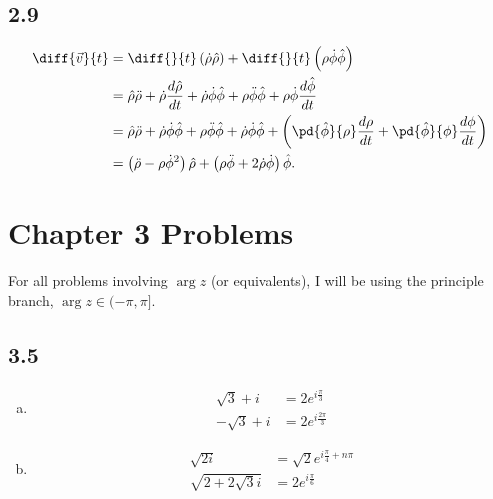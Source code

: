 \documentclass[10pt]{mypackage}
\begin{document}
\subsection{2.9}%
\begin{align*}
  \diff{\vec{v}}{t} &= \diff{}{t}\left(\dot{\rho}\hat\rho\right) + \diff{}{t}\left(\rho\dot\phi\hat\phi\right)\\
                    &= \hat{\rho}\ddot{\rho} + \dot\rho\frac{d\hat\rho}{dt} + \dot\rho\dot\phi\hat{\phi} + \rho\ddot\phi\hat\phi + \rho\dot\phi\frac{d\hat{\phi}}{dt}\\
                    &= \hat\rho\ddot\rho + \dot\rho\dot{\phi}\hat\phi + \rho\ddot\phi\hat\phi + \dot\rho\dot\phi\hat\phi + \left(\pd{\hat\phi}{\rho}\frac{d\rho}{dt} + \pd{\hat\phi}{\phi}\frac{d\phi}{dt}\right)\\
                    &= \left(\ddot\rho - \rho\dot\phi^2\right) \hat{\rho} + \left(\rho\ddot\phi + 2\dot\rho\dot\phi\right)\hat{\phi}.
\end{align*}
\section{Chapter 3 Problems}%
For all problems involving $\arg z$ (or equivalents), I will be using the principle branch, $\arg z \in (-\pi,\pi]$.
\subsection{3.5}%
\begin{enumerate}[(a)]
  \item
    \begin{align*}
      \sqrt{3} + i &= 2e^{i\frac{\pi}{3}}\\
      -\sqrt{3} + i &= 2e^{i\frac{2\pi}{3}}
    \end{align*}
  \item 
    \begin{align*}
      \sqrt{2i} &= \sqrt{2}e^{i \frac{\pi}{4} + n\pi}\\
      \sqrt{2 + 2\sqrt{3}i} &= 2e^{i \frac{\pi}{6}}
    \end{align*}
\end{enumerate}
\end{document}
